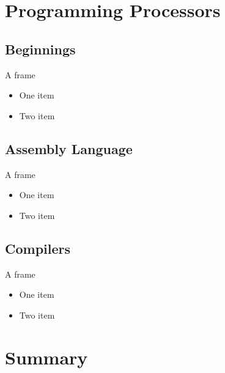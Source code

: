 \documentclass{beamer}
\begin{document}
\section{Programming Processors}

\subsection[Older]{Beginnings}

\begin{frame}{A frame}
  \begin{itemize}
  \item
    One item
  \item
    Two item
  \end{itemize}
\end{frame}

\subsection[Assembly]{Assembly Language}

\begin{frame}{A frame}
  \begin{itemize}
  \item
    One item
  \item
    Two item
  \end{itemize}
\end{frame}


\subsection[Compilers]{Compilers}

\begin{frame}{A frame}
  \begin{itemize}
  \item
    One item
  \item
    Two item
  \end{itemize}
\end{frame}





\section{Summary}
\end{document}
